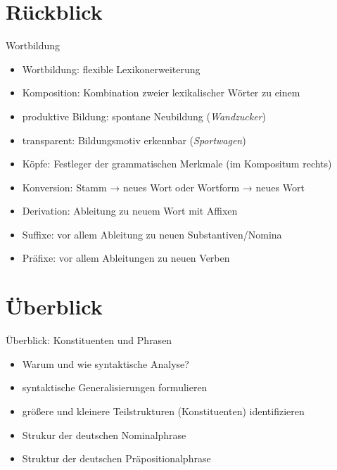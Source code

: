 \section{Rückblick}

\begin{frame}
  {Wortbildung}
  \pause
  \begin{itemize}[<+->]
    \item Wortbildung: flexible Lexikonerweiterung
      \Halbzeile
    \item Komposition: Kombination zweier lexikalischer Wörter zu einem
    \item produktive Bildung: spontane Neubildung (\textit{Wandzucker})
    \item transparent: Bildungsmotiv erkennbar (\textit{Sportwagen})
    \item Köpfe: Festleger der grammatischen Merkmale (im Kompositum rechts)
      \Halbzeile
    \item Konversion: Stamm → neues Wort oder Wortform → neues Wort
      \Halbzeile
    \item Derivation: Ableitung zu neuem Wort mit Affixen
    \item Suffixe: vor allem Ableitung zu neuen \alert{Substantiven}\slash Nomina
    \item Präfixe: vor allem Ableitungen zu neuen \alert{Verben}
  \end{itemize}
\end{frame}


\section{Überblick}

\begin{frame}
  {Überblick: Konstituenten und Phrasen}
  \pause
  \begin{itemize}[<+->]
    \item Warum und wie syntaktische Analyse?
    \item syntaktische Generalisierungen formulieren
    \item größere und kleinere Teilstrukturen (Konstituenten) identifizieren
      \Zeile
    \item Strukur der deutschen \alert{Nominalphrase}
    \item Struktur der deutschen \alert{Präpositionalphrase}
  \end{itemize}
\end{frame}

